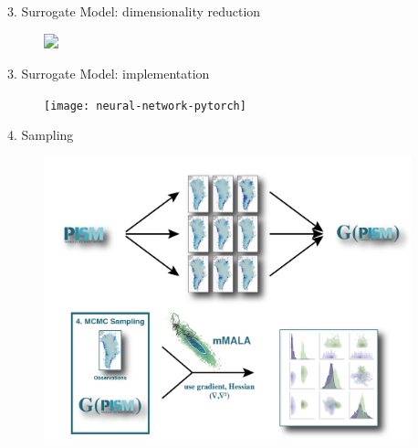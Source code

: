 \documentclass[aspectratio=169,hide notes,intlimits]{beamer}
\begin{document}
\begin{frame}{3. Surrogate Model: dimensionality reduction}
  \vspace{-0.5em}
  \begin{minipage}[t][8.2cm][t]{\textwidth}
    \begin{figure}
      \includegraphics<1>[width=\textwidth]{surrogate_model_pca}
    \end{figure}
  \end{minipage}
\end{frame}


\begin{frame}{3. Surrogate Model: implementation}
  \begin{figure}
    \texttt{[image: neural-network-pytorch]}
  \end{figure}
\end{frame}

\begin{frame}{4. Sampling}
  \vspace{-1.5em}
    \begin{minipage}[t][8.2cm][t]{\textwidth}
    \begin{figure}
      \includegraphics[height=8.2cm]{surrogate_model_4_mala}
    \end{figure}
    \end{minipage}
\end{frame}
\end{document}

